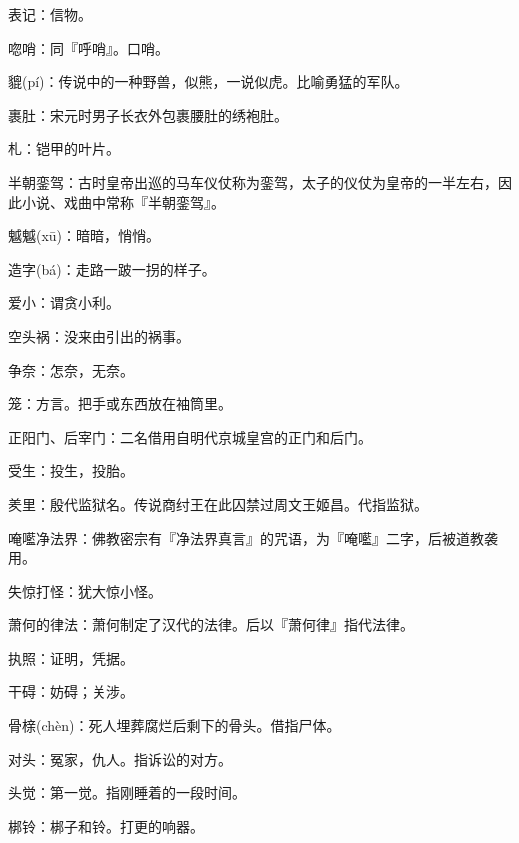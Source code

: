 \startbuffer[1311]
表记：信物。
\stopbuffer


\startbuffer[1312]
唿哨：同『呼哨』。口哨。
\stopbuffer


\startbuffer[1313]
貔(pí)：传说中的一种野兽，似熊，一说似虎。比喻勇猛的军队。
\stopbuffer


\startbuffer[1314]
裹肚：宋元时男子长衣外包裹腰肚的绣袍肚。
\stopbuffer


\startbuffer[1315]
札：铠甲的叶片。
\stopbuffer


\startbuffer[1316]
半朝銮驾：古时皇帝出巡的马车仪仗称为銮驾，太子的仪仗为皇帝的一半左右，因此小说、戏曲中常称『半朝銮驾』。
\stopbuffer


\startbuffer[1317]
魆魆(xū)：暗暗，悄悄。
\stopbuffer


\startbuffer[1318]
造字(bá)：走路一跛一拐的样子。
\stopbuffer


\startbuffer[1319]
爱小：谓贪小利。
\stopbuffer


\startbuffer[1320]
空头祸：没来由引出的祸事。
\stopbuffer


\startbuffer[1321]
争奈：怎奈，无奈。
\stopbuffer


\startbuffer[1322]
笼：方言。把手或东西放在袖筒里。
\stopbuffer


\startbuffer[1323]
正阳门、后宰门：二名借用自明代京城皇宫的正门和后门。
\stopbuffer


\startbuffer[1324]
受生：投生，投胎。
\stopbuffer


\startbuffer[1325]
羑里：殷代监狱名。传说商纣王在此囚禁过周文王姬昌。代指监狱。
\stopbuffer


\startbuffer[1326]
唵㘕净法界：佛教密宗有『净法界真言』的咒语，为『唵㘕』二字，后被道教袭用。
\stopbuffer


\startbuffer[1327]
失惊打怪：犹大惊小怪。
\stopbuffer


\startbuffer[1328]
萧何的律法：萧何制定了汉代的法律。后以『萧何律』指代法律。
\stopbuffer


\startbuffer[1329]
执照：证明，凭据。
\stopbuffer


\startbuffer[1330]
干碍：妨碍；关涉。
\stopbuffer


\startbuffer[1331]
骨榇(chèn)：死人埋葬腐烂后剩下的骨头。借指尸体。
\stopbuffer


\startbuffer[1332]
对头：冤家，仇人。指诉讼的对方。
\stopbuffer


\startbuffer[1333]
头觉：第一觉。指刚睡着的一段时间。
\stopbuffer


\startbuffer[1334]
梆铃：梆子和铃。打更的响器。
\stopbuffer


